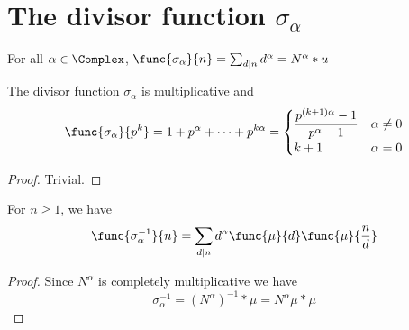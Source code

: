 \section{The divisor function \(\sigma_{\alpha}\)}
\begin{definition}
    For all \(\alpha \in \Complex\), \(\func{\sigma_{\alpha}}{n} = \sum_{d \mid n} d^{\alpha} =  N^{\alpha} \ast u\)
\end{definition}
\begin{proposition}
    The divisor function \(\sigma_{\alpha}\) is multiplicative and
    \begin{equation*}
        \func{\sigma_{\alpha}}{p^k} = 1 + p^{\alpha} + \dots + p^{k \alpha} = \begin{cases}
            \dfrac{p^{(k+1)\alpha} - 1}{p^{\alpha} - 1} & \alpha \neq 0\\
            k + 1 & \alpha = 0
        \end{cases}
    \end{equation*}
\end{proposition}

\begin{proof}
    Trivial.
\end{proof}

\begin{theorem}
    For \(n \geq 1\), we have 
    \begin{equation*}
        \func{\sigma_{\alpha}^{-1}}{n} = \sum_{d \mid n} d^{\alpha} \func{\mu}{d} \func{\mu}{\frac{n}{d}}
    \end{equation*}
\end{theorem}
\begin{proof}
    Since \(N^{\alpha}\) is completely multiplicative we have
    \begin{equation*}
        \sigma_{\alpha}^{-1} = (N^{\alpha})^{-1} \ast \mu = N^{\alpha} \mu \ast \mu
    \end{equation*}
\end{proof}

